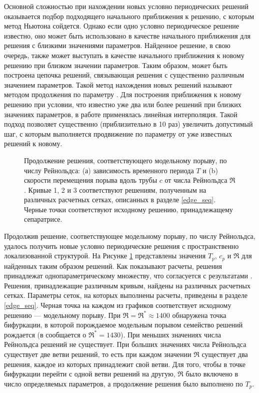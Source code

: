 Основной сложностью при нахождении новых условно периодических решений оказывается подбор подходящего начального приближения к решению, с которым метод Ньютона сойдется. Однако если одно условно периодическое решение известно, оно может быть использовано в качестве начального приближения для решения с близкими значениями параметров. Найденное решение, в свою очередь, также может выступать в качестве начального приближения к новому решению при близком значении параметров. Таким образом, может быть построена цепочка решений, связывающая решения с существенно различным значением параметров. Такой метод нахождения новых решений называют методом продолжения по параметру \cite{Viswanath2007, Dijkstra2014}. Для построения приближения к новому решению при условии, что известно уже два или более решений при близких значениях параметров, в работе применялась линейная интерполяция. Такой подход позволяет существенно (приблизительно в 10 раз) увеличить допустимый шаг, с которым выполняется продвижение по параметру от уже известных решений к новому. 

\begin{figure}
\caption{Продолжение решения, соответствующего модельному порыву, по числу Рейнольдса: (а) зависимость временного периода $T$ и (b) скорости перемещения порыва вдоль трубы $c$ от числа Рейнольдса $\Re$. Кривые 1, 2 и 3 соответствуют решениям, полученным на различных расчетных сетках, описанных в разделе \ref{edge_seq}. Черные точки соответствуют исходному решению, принадлежащему сепаратрисе.}
\label{local_contin_pic}
\end{figure}

Продолжив решение, соответствующее модельному порыву, по числу Рейнольдса, удалось получить новые условно периодические решения с пространственно локализованной структурой. На Рисунке \ref{local_contin_pic} представлены значения $T_p$, $c_p$ и $\Re$ для найденных таким образом решений. Как показывают расчеты, решения принадлежат однопараметрическому множеству, что согласуется с результатами \cite{Avila2013}. Решения, принадлежащие различным кривым, найдены на различных расчетных сетках. Параметры сеток, на которых выполнены расчеты, приведены в разделе \ref{edge_seq}. Черная точка на каждом из графиков соответствует исходному решению --- модельному порыву. При $\Re = \Re^* \approx 1400$ обнаружена точка бифуркации, в которой порождаемое модельным порывом семейство решений рождается (в \cite{Avila2013} сообщается о $\Re^* = 1430$). При меньших значениях числа Рейнольдса решений не существует. При больших значениях числа Рейнольдса существует две ветви решений, то есть при каждом значении $\Re$ существует два решения, каждое из которых принадлежит свой ветви. Для того, чтобы в точке бифуркации перейти с одной ветви решений на другую, $\Re$ было включено в число определяемых параметров, а продолжение решения было выполнено по $T_p$. 

